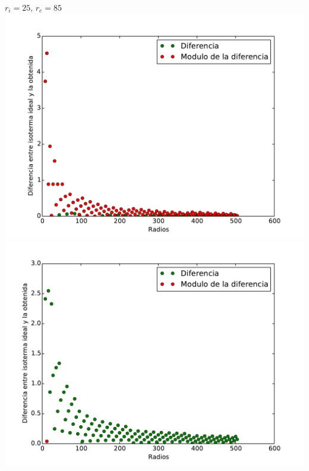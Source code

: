 $r_i = 25$, $r_e = 85$ \\
\includegraphics[scale=0.45]{graficos/mVariable_l_25_85.pdf}
\includegraphics[scale=0.45]{graficos/mVariable_w_25_85.pdf}
\newline

